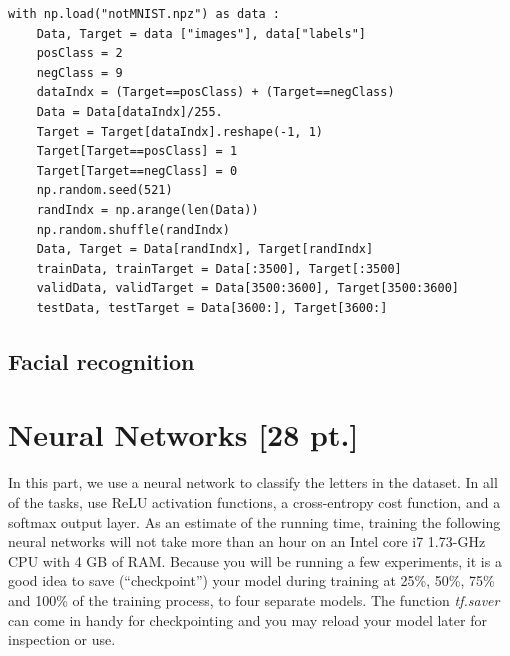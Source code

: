 \documentclass[12pt,letterpaper]{article}
\begin{document}
\begin{verbatim}
with np.load("notMNIST.npz") as data :
    Data, Target = data ["images"], data["labels"]
    posClass = 2
    negClass = 9
    dataIndx = (Target==posClass) + (Target==negClass)
    Data = Data[dataIndx]/255.
    Target = Target[dataIndx].reshape(-1, 1)
    Target[Target==posClass] = 1
    Target[Target==negClass] = 0
    np.random.seed(521)
    randIndx = np.arange(len(Data))
    np.random.shuffle(randIndx)
    Data, Target = Data[randIndx], Target[randIndx]
    trainData, trainTarget = Data[:3500], Target[:3500]
    validData, validTarget = Data[3500:3600], Target[3500:3600]
    testData, testTarget = Data[3600:], Target[3600:]
\end{verbatim}

\subsection*{Facial recognition}

\section{Neural Networks [28 pt.]}

In this part, we use a neural network to classify the letters in the dataset. In all of the tasks, use ReLU activation functions, a cross-entropy cost function, and a softmax output layer. As an estimate of the running time, training the following neural networks will not take more than an hour on an Intel core i7 1.73-GHz CPU with 4 GB of RAM. Because you will be running a few experiments, it is a good idea to save (``checkpoint'') your model during training at 25\%, 50\%, 75\% and 100\% of the training process, to four separate models. The function \textit{tf.saver} can come in handy for checkpointing and you may reload your model later for inspection or use.
\end{document}
